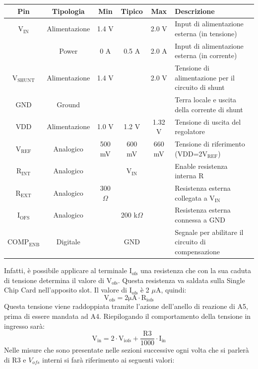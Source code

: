 \begin{small}
\noindent\setlength\tabcolsep{4pt}%
\begin{tabularx}{\linewidth}{|c|c|c|c|c|X|}
\hline
\textbf{Pin} & \textbf{Tipologia} & \textbf{Min} & \textbf{Tipico} & \textbf{Max} & \textbf{Descrizione} \\ \hline

$\mathrm{V_{IN}}$ & Alimentazione & 1.4 V & & 2.0 V & Input di alimentazione esterna (in tensione)\\ \hline
 & Power & 0 A & 0.5 A & 2.0 A & Input di alimentazione esterna (in corrente)\\ \hline     
$\mathrm{V_{SHUNT}}$ & Alimentazione & 1.4 V & & 2.0 V & Tensione di alimentazione per il circuito di shunt\\ \hline
GND & Ground &  & &  & Terra locale e uscita della corrente di shunt\\ \hline
VDD & Alimentazione & 1.0 V & 1.2 V & 1.32 V & Tensione di uscita del regolatore\\ \hline
$\mathrm{V_{REF}}$ & Analogico & 500 mV & 600 mV & 660 mV & Tensione di riferimento (VDD=2$\mathrm{V_{REF}}$)\\ \hline
$\mathrm{R_{INT}}$ & Analogico &  & $\mathrm{V_{IN}}$ &  & Enable resistenza interna R\\ \hline
$\mathrm{R_{EXT}}$ & Analogico & 300 $\Omega$ &  &  & Resistenza esterna collegata a $\mathrm{V_{IN}}$\\ \hline
$\mathrm{I_{OFS}}$ & Analogico &  & 200 k$\Omega$ &  & Resistenza esterna connessa a GND\\ \hline
$\mathrm{COMP_{ENB}}$ & Digitale &  & GND &  & Segnale per abilitare il circuito di compensazione\\ \hline
\end{tabularx}
\end{small}

Infatti, è possibile applicare al terminale $\mathrm{I_{ofs}}$ una resistenza che con la sua caduta di tensione determina il valore di $\mathrm{V_{ofs}}$. 
Questa resistenza va saldata sulla Single Chip Card nell'apposito slot. Il valore di $\mathrm{I_{ofs}}$ è 2 $\mu$A, quindi:
\begin{equation}
\label{eq:Vofs}
\mathrm{V_{ofs} = 2 \mu A \cdot R_{iofs}}
\end{equation}
Questa tensione viene raddoppiata tramite l'azione dell'anello di reazione di A5, prima di essere mandata ad A4.
Riepilogando il comportamento della tensione in ingresso sarà:
\begin{equation}
\mathrm{V_{in}= 2 \cdot V_{iofs} + \dfrac{R3}{1000} \cdot I_{in}}
\end{equation}
Nelle misure che sono presentate nelle sezioni successive ogni volta che si parlerà di R3 e $V_{ofs}$ interni si farà riferimento ai seguenti valori:

